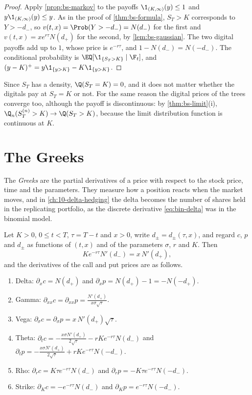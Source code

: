 \begin{proof}
Apply \cref{prop:bs-markov} to the payoffs $\1_{(K,\infty)}(y)\le1$ and
$y\1_{(K,\infty)}(y)\le y$. As in the proof of \cref{thm:bs-formula}, $S_T>K$ corresponds to
$Y>-d_-$, so $v(t,x)=\Prob(Y>-d_-)=N(d_-)$ for the first and $v(t,x)=xe^{r\tau}N(d_+)$ for the
second, by \cref{lem:bs-gaussian}. The two digital payoffs add up to $1$, whose price is
$e^{-r\tau}$, and $1-N(d_-)=N(-d_-)$. The conditional probability is
$\EQ[\1_{\{S_T>K\}}\mid\F_t]$, and $(y-K)^+=y\1_{\{y>K\}}-K\1_{\{y>K\}}$.
\end{proof}

Since $S_T$ has a density, $\Q(S_T=K)=0$, and it does not matter whether the digitals pay at
$S_T=K$ or not. For the same reason the digital prices of the trees converge too, although
the payoff is discontinuous: by \cref{thm:bs-limit}(i), $\Q_n(S^{(n)}_T>K)\to\Q(S_T>K)$,
because the limit distribution function is continuous at $K$.

\section{The Greeks}\label{sec:bs-greeks}

The \emph{Greeks} are the partial derivatives of a price with respect to the stock price,
time and the parameters. They measure how a position reacts when the market moves, and in
\cref{ch:10-delta-hedging} the delta becomes the number of shares held in the replicating
portfolio, as the discrete derivative \eqref{eq:bin-delta} was in the binomial model.

\begin{proposition}\label{prop:bs-greeks}
Let $K>0$, $0\le t<T$, $\tau=T-t$ and $x>0$, write $d_\pm=d_\pm(\tau,x)$, and regard $c$, $p$
and $d_\pm$ as functions of $(t,x)$ and of the parameters $\sigma$, $r$ and $K$. Then
\begin{equation}\label{eq:bs-identity}
  Ke^{-r\tau}N'(d_-)=x\,N'(d_+),
\end{equation}
and the derivatives of the call and put prices are as follows.
\begin{enumerate}[label=(\roman*)]
  \item Delta: $\partial_xc=N(d_+)$ and $\partial_xp=N(d_+)-1=-N(-d_+)$.
  \item Gamma: $\displaystyle\partial_{xx}c=\partial_{xx}p=\frac{N'(d_+)}{x\sigma\sqrt\tau}$.
  \item Vega: $\partial_\sigma c=\partial_\sigma p=x\,N'(d_+)\sqrt\tau$.
  \item Theta: $\displaystyle\partial_tc=-\frac{x\sigma N'(d_+)}{2\sqrt\tau}-rKe^{-r\tau}N(d_-)$ and
    $\displaystyle\partial_tp=-\frac{x\sigma N'(d_+)}{2\sqrt\tau}+rKe^{-r\tau}N(-d_-)$.
  \item Rho: $\partial_rc=K\tau e^{-r\tau}N(d_-)$ and $\partial_rp=-K\tau e^{-r\tau}N(-d_-)$.
  \item Strike: $\partial_Kc=-e^{-r\tau}N(d_-)$ and $\partial_Kp=e^{-r\tau}N(-d_-)$.
\end{enumerate}
\end{proposition}

